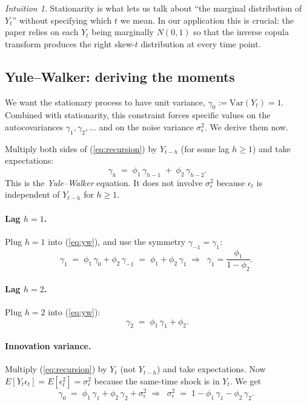 \documentclass[11pt]{article}
\newcommand{\skewt}{skew-$t$\xspace}
\newcommand{\eref}[1]{(\ref{#1})}
\theoremstyle{plain}
\theoremstyle{definition}
\theoremstyle{remark}
\newtheorem*{intuition}{Intuition}
\begin{document}
\begin{intuition}
Stationarity is what lets us talk about ``the marginal distribution of
$Y_t$'' without specifying which $t$ we mean. In our application this is
crucial: the paper relies on each $Y_t$ being marginally $N(0, 1)$ so
that the inverse copula transform produces the right \skewt distribution
at every time point.
\end{intuition}

\subsection{Yule--Walker: deriving the moments}\label{sec:moments}

We want the stationary process to have unit variance, $\gamma_0
:= \mathrm{Var}(Y_t) = 1$. Combined with stationarity, this constraint
forces specific values on the autocovariances $\gamma_1, \gamma_2, \ldots$
and on the noise variance $\sigma_\epsilon^2$. We derive them now.

Multiply both sides of \eref{eq:recursion} by $Y_{t-h}$ (for some lag
$h \geq 1$) and take expectations:
\begin{equation}\label{eq:yw}
  \gamma_h \;=\; \phi_1\, \gamma_{h-1} \;+\; \phi_2\, \gamma_{h-2}.
\end{equation}
This is the \emph{Yule--Walker} equation. It does not involve
$\sigma_\epsilon^2$ because $\epsilon_t$ is independent of $Y_{t-h}$ for
$h \geq 1$.

\paragraph{Lag $h = 1$.}
Plug $h = 1$ into \eref{eq:yw}, and use the symmetry
$\gamma_{-1} = \gamma_1$:
\[
  \gamma_1
  \;=\; \phi_1\, \gamma_0 + \phi_2\, \gamma_{-1}
  \;=\; \phi_1 + \phi_2\, \gamma_1
  \;\Longrightarrow\;
  \boxed{\;\gamma_1 = \dfrac{\phi_1}{1 - \phi_2}.\;}
\]

\paragraph{Lag $h = 2$.}
Plug $h = 2$ into \eref{eq:yw}:
\[
  \boxed{\;\gamma_2 \;=\; \phi_1\, \gamma_1 + \phi_2.\;}
\]

\paragraph{Innovation variance.}
Multiply \eref{eq:recursion} by $Y_t$ (not $Y_{t-h}$) and take
expectations. Now $E[Y_t \epsilon_t] = E[\epsilon_t^2] = \sigma_\epsilon^2$
because the same-time shock is in $Y_t$. We get
\[
  \gamma_0 \;=\; \phi_1\, \gamma_1 + \phi_2\, \gamma_2 + \sigma_\epsilon^2
  \;\Longrightarrow\;
  \boxed{\;\sigma_\epsilon^2 \;=\; 1 - \phi_1\, \gamma_1 - \phi_2\, \gamma_2.\;}
\]
\end{document}
